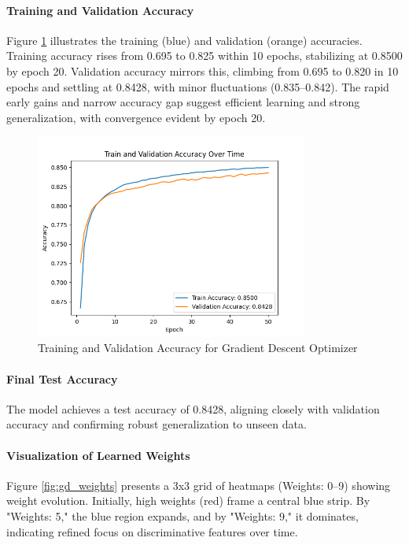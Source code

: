 \documentclass{article}
\begin{document}
\paragraph{Training and Validation Accuracy}

Figure \ref{fig:gd_accuracy} illustrates the training (blue) and validation (orange) accuracies. Training accuracy rises from 0.695 to 0.825 within 10 epochs, stabilizing at 0.8500 by epoch 20. Validation accuracy mirrors this, climbing from 0.695 to 0.820 in 10 epochs and settling at 0.8428, with minor fluctuations (0.835–0.842). The rapid early gains and narrow accuracy gap suggest efficient learning and strong generalization, with convergence evident by epoch 20.

\begin{figure}[H]
    \centering
    \includegraphics[width=0.8\textwidth]{assets/q2/gradient_descent/accuracy_50_epochs.png}
    \caption{Training and Validation Accuracy for Gradient Descent Optimizer}
    \label{fig:gd_accuracy}
\end{figure}

\paragraph{Final Test Accuracy}

The model achieves a test accuracy of 0.8428, aligning closely with validation accuracy and confirming robust generalization to unseen data.

\paragraph{Visualization of Learned Weights}

Figure \ref{fig:gd_weights} presents a 3x3 grid of heatmaps (Weights: 0–9) showing weight evolution. Initially, high weights (red) frame a central blue strip. By "Weights: 5," the blue region expands, and by "Weights: 9," it dominates, indicating refined focus on discriminative features over time.
\end{document}
